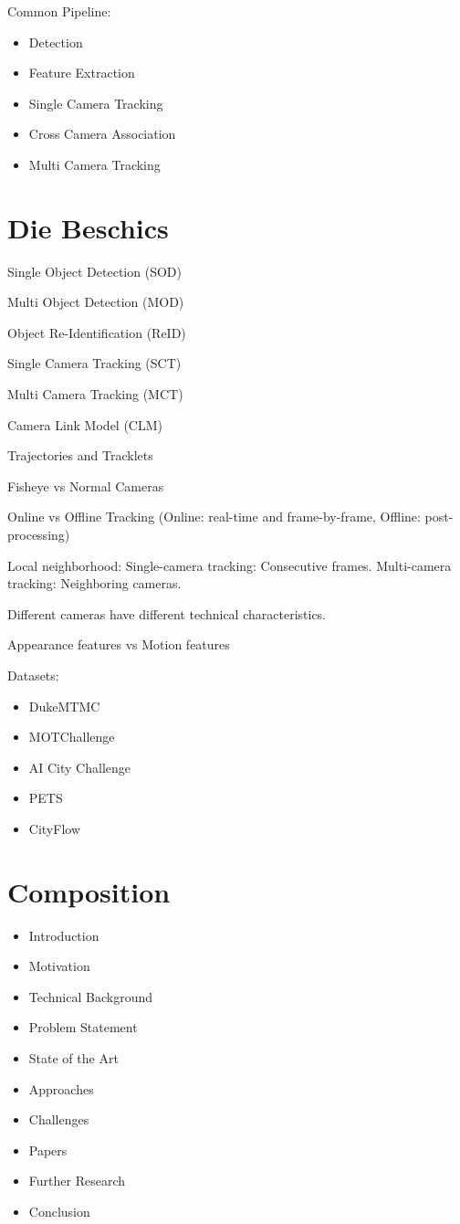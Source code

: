 Common Pipeline:
\begin{itemize}
	\item Detection
	\item Feature Extraction
	\item Single Camera Tracking
	\item Cross Camera Association
	\item Multi Camera Tracking
\end{itemize}

\section{Die Beschics}

Single Object Detection (SOD)

Multi Object Detection (MOD)

Object Re-Identification (ReID)

Single Camera Tracking (SCT)

Multi Camera Tracking (MCT)

Camera Link Model (CLM)

Trajectories and Tracklets

Fisheye vs Normal Cameras

Online vs Offline Tracking (Online: real-time and frame-by-frame, Offline: post-processing)

Local neighborhood:
Single-camera tracking: Consecutive frames.
Multi-camera tracking: Neighboring cameras.

Different cameras have different technical characteristics.

Appearance features vs Motion features

Datasets:
\begin{itemize}
	\item DukeMTMC
	\item MOTChallenge
	\item AI City Challenge
	\item PETS
	\item CityFlow
\end{itemize}

\section{Composition}

\begin{itemize}
	\item Introduction
	\item Motivation
	\item Technical Background
	\item Problem Statement
	\item State of the Art
	\item Approaches
	\item Challenges
	\item Papers
	\item Further Research
	\item Conclusion
\end{itemize}

